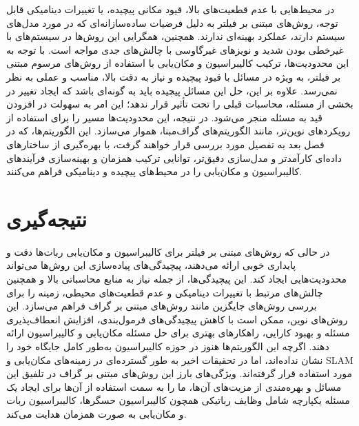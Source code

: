 در محیط‌هایی با عدم قطعیت‌های بالا، قیود مکانی پیچیده، یا تغییرات دینامیکی قابل توجه، روش‌های مبتنی بر فیلتر به دلیل فرضیات ساده‌سازانه‌ای که در مورد مدل‌های سیستم دارند، عملکرد بهینه‌ای ندارند. همچنین، همگرایی این روش‌ها در سیستم‌های با غیرخطی‌ بودن شدید و نویزهای غیرگاوسی با چالش‌های جدی مواجه است.
با توجه به این محدودیت‌ها، ترکیب کالیبراسیون و مکان‌یابی با استفاده از روش‌های مرسوم مبتنی بر فیلتر، به ویژه در مسائل با قیود پیچیده و نیاز به دقت بالا، مناسب و عملی به نظر نمی‌رسد. علاوه بر این، حل این مسائل پیچیده باید به گونه‌ای باشد که ایجاد تغییر در بخشی از مسئله، محاسبات قبلی را تحت تأثیر قرار ندهد؛ این امر به سهولت در افزودن قید به مسئله منجر می‌شود. در نتیجه، این محدودیت‌ها مسیر را برای استفاده از رویکردهای نوین‌تر، مانند الگوریتم‌های گراف‌مبنا، هموار می‌سازد. این الگوریتم‌ها، که در فصل بعد به تفصیل مورد بررسی قرار خواهند گرفت، با بهره‌گیری از ساختارهای داده‌ای کارآمدتر و مدل‌سازی دقیق‌تر، توانایی ترکیب همزمان و بهینه‌سازی فرآیندهای کالیبراسیون و مکان‌یابی را در محیط‌های پیچیده و دینامیکی فراهم می‌کنند.

\section{نتیجه‌گیری}
در حالی که روش‌های مبتنی بر فیلتر برای کالیبراسیون و مکان‌یابی ربات‌ها دقت و پایداری خوبی ارائه می‌دهند، پیچیدگی‌های پیاده‌سازی این روش‌ها می‌تواند محدودیت‌هایی ایجاد کند. این پیچیدگی‌ها، از جمله نیاز به منابع محاسباتی بالا و همچنین چالش‌های مرتبط با تغییرات دینامیکی و عدم قطعیت‌های محیطی، زمینه را برای بررسی روش‌های جایگزین مانند روش‌های مبتنی بر گراف فراهم می‌سازد. این روش‌های نوین، ممکن است با کاهش پیچیدگی‌های فرمول‌بندی، افزایش انعطاف‌پذیری مسئله و بهبود کارایی، راهکارهای بهتری برای حل مسئله مکان‌یابی و کالیبراسیون ارائه دهند. اگرچه این الگوریتم‌ها هنوز در حوزه کالیبراسیون به‌طور کامل جایگاه خود را نشان نداده‌اند، اما در تحقیقات اخیر به طور گسترده‌ای در زمینه‌های مکان‌یابی و SLAM مورد استفاده قرار گرفته‌اند. ویژگی‌های بارز این روش‌های مبتنی بر گراف در تلفیق این مسائل و بهره‌مندی از مزیت‌های آن‌ها، ما را به سمت استفاده از آن‌ها برای ایجاد یک مسئله یکپارچه شامل وظایف رباتیکی همچون کالیبراسیون حسگرها، کالیبراسیون ربات و مکان‌یابی به صورت همزمان هدایت می‌کند.

